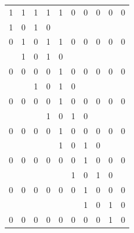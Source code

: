 \begin{table}[H]
\begin{center} 
\begin{tabular}{|l l l l l l l l l l|}

    \hline
    \rowcolor{lightgray}
    1 & 1 & 1 & 1 & 1 & 0 & 0 & 0 & 0 & 0 \\
    \cellcolor{green}1 & \cellcolor{green}0 & \cellcolor{green}1 & \cellcolor{green}0 & & & & & & \\
    \hline
    \rowcolor{lightgray}
    0 & 1 & 0 & 1 & 1 & 0 & 0 & 0 & 0 & 0 \\
    & \cellcolor{green}1 & \cellcolor{green}0 & \cellcolor{green}1 & \cellcolor{green}0 & & & & &\\
    \hline
    \rowcolor{lightgray}
    0 & 0 & 0 & 0 & 1 & 0 & 0 & 0 & 0 & 0 \\
    & & \cellcolor{red}1 & \cellcolor{red}0 & \cellcolor{red}1 & \cellcolor{red}0 & & & & \\
    \hline
    \rowcolor{lightgray}
    0 & 0 & 0 & 0 & 1 & 0 & 0 & 0 & 0 & 0 \\
    & & & \cellcolor{red}1 & \cellcolor{red}0 & \cellcolor{red}1 & \cellcolor{red}0 & & & \\
    \hline
    \rowcolor{lightgray}
    0 & 0 & 0 & 0 & 1 & 0 & 0 & 0 & 0 & 0 \\
    & & & & \cellcolor{green}1 & \cellcolor{green}0 & \cellcolor{green}1 & \cellcolor{green}0 & & \\
    \hline
    \rowcolor{lightgray}
    0 & 0 & 0 & 0 & 0 & 0 & 1 & 0 & 0 & 0 \\
    & & & & & \cellcolor{red}1 & \cellcolor{red}0 & \cellcolor{red}1 & \cellcolor{red}0 & \\
    \hline
    \rowcolor{lightgray}
    0 & 0 & 0 & 0 & 0 & 0 & 1 & 0 & 0 & 0 \\
    & & & & & & \cellcolor{green}1 & \cellcolor{green}0 & \cellcolor{green}1 & \cellcolor{green}0 \\
    \hline
    \cellcolor{lightgray}0 & \cellcolor{lightgray}0 & \cellcolor{lightgray}0 & \cellcolor{lightgray}0 & \cellcolor{lightgray}0 & \cellcolor{lightgray}0 & \cellcolor{blue}0 & \cellcolor{blue}0 & \cellcolor{blue}1 & \cellcolor{blue}0 \\
    \hline
    
\end{tabular}
\end{center}

\end{table}


